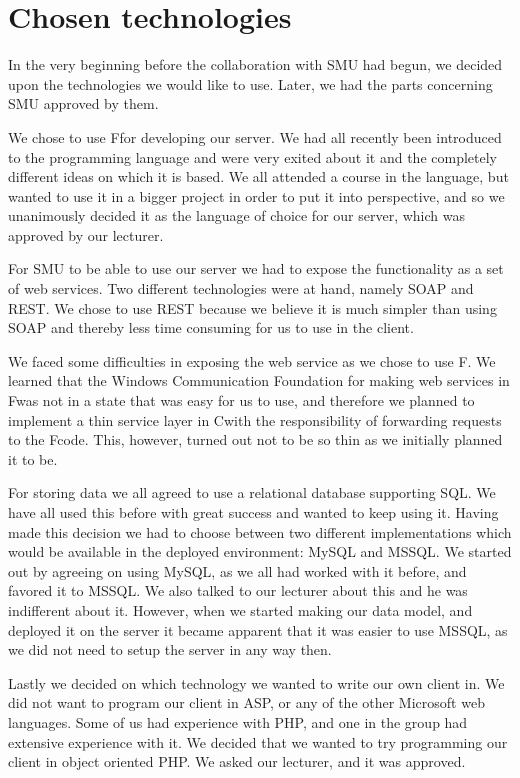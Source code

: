 \section{Chosen technologies}
In the very beginning before the collaboration with SMU had begun, we decided upon the technologies we would like to use. Later, we had the parts concerning SMU approved by them.

We chose to use F\Sh for developing our server. We had all recently been introduced to the programming language and were very exited about it and the completely different ideas on which it is based.
We all attended a course in the language, but wanted to use it in a bigger project in order to put it into perspective, and so we unanimously decided it as the language of choice for our server, which was approved by our lecturer.

For SMU to be able to use our server we had to expose the functionality as a set of web services. Two different technologies were at hand, namely SOAP and REST.
We chose to use REST because we believe it is much simpler than using SOAP and thereby less time consuming for us to use in the client.

We faced some difficulties in exposing the web service as we chose to use F\Sh.
We learned that the Windows Communication Foundation for making web services in F\Sh was not in a state that was easy for us to use, and therefore we planned to implement a thin service layer in C\Sh with the responsibility of forwarding requests to the F\Sh code. This, however, turned out not to be so thin as we initially planned it to be.

For storing data we all agreed to use a relational database supporting SQL. We have all used this before with great success and wanted to keep using it.
Having made this decision we had to choose between two different implementations which would be available in the deployed environment: MySQL and MSSQL. We started out by agreeing on using MySQL, as we all had worked with it before, and favored it to MSSQL. We also talked to our lecturer about this and he was indifferent about it. However, when we started making our data model, and deployed it on the server it became apparent that it was easier to use MSSQL, as we did not need to setup the server in any way then.

Lastly we decided on which technology we wanted to write our own client in. We did not want to program our client in ASP, or any of the other Microsoft web languages. Some of us had experience with PHP, and one in the group had extensive experience with it. We decided that we wanted to try programming our client in object oriented PHP. We asked our lecturer, and it was approved.
\newpage